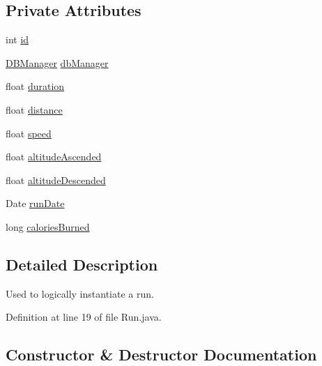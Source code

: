 \subsection*{Private Attributes}
\begin{DoxyCompactItemize}
\item 
int \mbox{\hyperlink{classcom_1_1activitytracker_1_1_run_aa76717aee690b5bfe919d6e87dea1d84}{id}}
\item 
\mbox{\hyperlink{classcom_1_1activitytracker_1_1_d_b_manager}{D\+B\+Manager}} \mbox{\hyperlink{classcom_1_1activitytracker_1_1_run_ab90e32eda9f4c671ae3575f971edca6b}{db\+Manager}}
\item 
float \mbox{\hyperlink{classcom_1_1activitytracker_1_1_run_a5e38d293d29d4b65c9290ff4bee82e03}{duration}}
\item 
float \mbox{\hyperlink{classcom_1_1activitytracker_1_1_run_a7b4ca8c4ecea4da1653f03b8c8fc16a8}{distance}}
\item 
float \mbox{\hyperlink{classcom_1_1activitytracker_1_1_run_ada0c6e189d55997133cde5bbe9913984}{speed}}
\item 
float \mbox{\hyperlink{classcom_1_1activitytracker_1_1_run_ad28bf8d709b4cfcdb93a51033a90728c}{altitude\+Ascended}}
\item 
float \mbox{\hyperlink{classcom_1_1activitytracker_1_1_run_a4997349f78c9147a30811306c2ab5223}{altitude\+Descended}}
\item 
Date \mbox{\hyperlink{classcom_1_1activitytracker_1_1_run_a2f519da043ea384f1ba0d156f4971367}{run\+Date}}
\item 
long \mbox{\hyperlink{classcom_1_1activitytracker_1_1_run_aa4c73467653a47d3b14ff6653bbab853}{calories\+Burned}}
\end{DoxyCompactItemize}


\subsection{Detailed Description}
Used to logically instantiate a run. 

Definition at line 19 of file Run.\+java.



\subsection{Constructor \& Destructor Documentation}
\mbox{\label{classcom_1_1activitytracker_1_1_run_a5568c1c514835056d2abc22cfba222c5}} 
